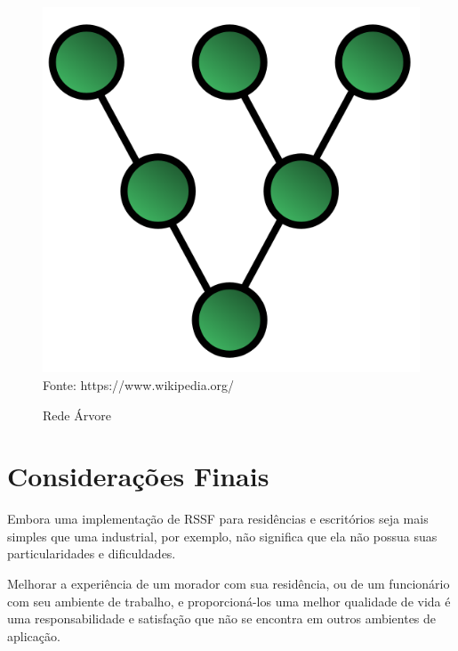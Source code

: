 \begin{figure}[h]
	\caption{Rede Árvore}
	\centering
	\includegraphics[scale=0.25]{../images/tree.png}
	\hspace{\linewidth}
	Fonte: https://www.wikipedia.org/
	\label{figura:tree}
\end{figure}

\section{Considerações Finais}
Embora uma implementação de RSSF para residências e escritórios seja mais simples que uma industrial, por
exemplo, não significa que ela não possua suas particularidades e dificuldades.

Melhorar a experiência de um morador com sua residência, ou de um funcionário com seu ambiente de trabalho, e
proporcioná-los uma melhor qualidade de vida é uma responsabilidade e satisfação que não se encontra em outros
ambientes de aplicação.
